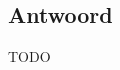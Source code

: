 \documentclass[indexstructuren.tex]{subfiles}
\begin{document}
\begin{itemize}
\begin{itemize}
\end{itemize}
\end{itemize}
\subsection*{Antwoord}
TODO
\end{document}
